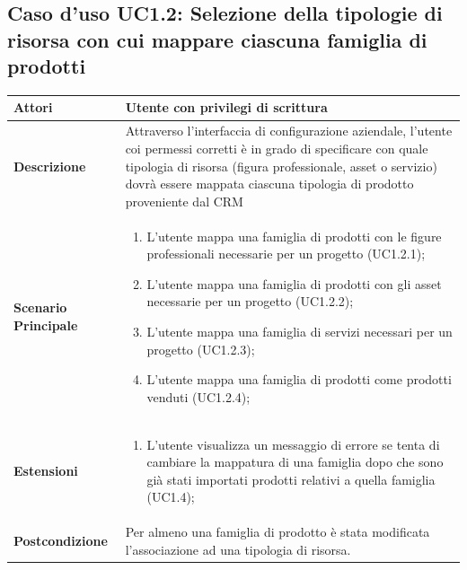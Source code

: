 \documentclass[12pt,a4paper,twoside,openright,english]{book}
\begin{document}
\begin{small}
	\subsection{Caso d'uso UC1.2: Selezione della tipologie di risorsa con cui mappare ciascuna famiglia di prodotti}
	\begin{longtable}{ | p{2.7cm} | p{12cm} |}
		\hline \textbf{Attori} & Utente con privilegi di scrittura\\ 
		\hline \textbf{Descrizione} & Attraverso l’interfaccia di configurazione aziendale, l’utente coi permessi corretti è in grado di specificare con quale tipologia di risorsa (figura professionale, asset o servizio) dovrà essere mappata ciascuna tipologia di prodotto proveniente dal CRM\\ 
		\hline \textbf{Scenario Principale} & \begin{enumerate}
			\item L’utente mappa una famiglia di prodotti con le figure professionali necessarie per un progetto  (UC1.2.1);
			\item L’utente mappa una famiglia di prodotti con gli asset necessarie per un progetto  (UC1.2.2);
			\item L’utente mappa una famiglia di servizi necessari per un progetto  (UC1.2.3);
			\item L’utente mappa una famiglia di prodotti come prodotti venduti (UC1.2.4);
			
		\end{enumerate}
		\\ 
		\hline \textbf{Estensioni} & \begin{enumerate}
			\item L’utente visualizza un messaggio di errore se tenta di cambiare la mappatura di una famiglia dopo che sono già stati importati prodotti relativi a quella famiglia  (UC1.4);
			
		\end{enumerate}
		\\ 
		\hline \textbf{Postcondizione} & Per almeno una famiglia di prodotto è stata modificata l’associazione ad una tipologia di risorsa. \\ 
		\hline 
	\end{longtable}
	
	\hypertarget{UC1.3}{}

\end{small}
\end{document}
